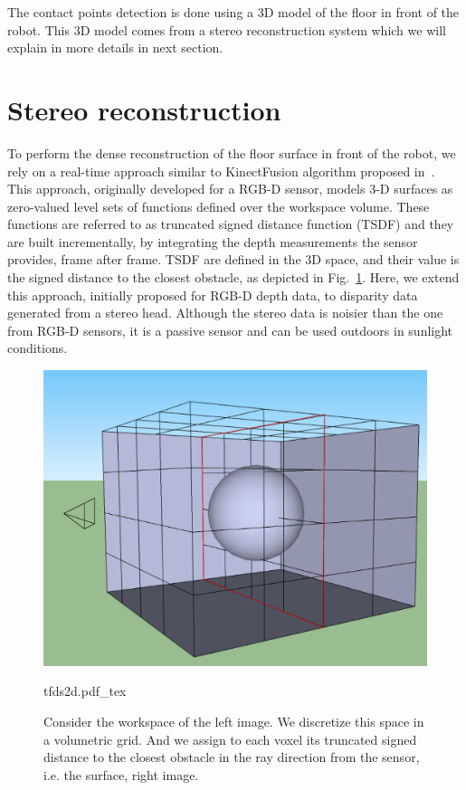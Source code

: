 The contact points detection is done using a 3D model of the floor in front of the robot. This 3D model comes from a stereo reconstruction system which we will explain in more details in next section.

\section{Stereo reconstruction}

To perform the dense reconstruction of the floor surface in front of the robot, we rely on a real-time approach similar to KinectFusion algorithm proposed in~\citep{Newcombe2011}. This approach, originally developed for a RGB-D sensor, models 3-D surfaces as zero-valued level sets of functions defined over the workspace volume. These functions are referred to as truncated signed distance function (TSDF) and they are built incrementally, by integrating the depth measurements the sensor provides, frame after frame. TSDF are defined in the 3D space, and their value is the signed distance to the closest obstacle, as depicted in Fig.~\ref{Fig:TFDS}. Here, we extend this approach, initially proposed for RGB-D depth data, to disparity data generated from a stereo head. Although the stereo data is noisier than the one from RGB-D sensors, it is a passive sensor and can be used outdoors in sunlight conditions.


\begin{figure}
  \centering
\includegraphics[scale=0.3]{Chap6-3D-Reconstruction/tfds}
      {\def\svgwidth{0.35\columnwidth}
        
                   {tfds2d.pdf_tex}}
      \caption[]{Consider the workspace of the left image. We discretize this space in a volumetric grid. And we assign to each voxel its truncated signed distance to the closest obstacle in the ray direction from the sensor, i.e. the surface, right image.}
      \label{Fig:TFDS}
\end{figure}


